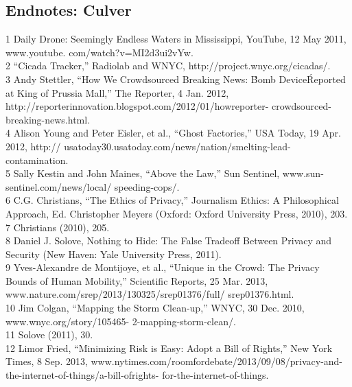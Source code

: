 \begin{itemize}
\begin{itemized}
\begin{itemize}
\section{Endnotes: Culver}
1 Daily Drone: Seemingly Endless Waters in Mississippi, YouTube, 12 May 2011, www.youtube.
com/watch?v=MI2d3ui2vYw.\\
2 ``Cicada Tracker,'' Radiolab and WNYC, http://project.wnyc.org/cicadas/.\\
3 Andy Stettler, ``How We Crowdsourced Breaking News: \'Bomb Device\' Reported at King of
Prussia Mall,'' The Reporter, 4 Jan. 2012, http://reporterinnovation.blogspot.com/2012/01/howreporter-
crowdsourced-breaking-news.html.\\
4 Alison Young and Peter Eisler, et al., ``Ghost Factories,'' USA Today, 19 Apr. 2012, http://
usatoday30.usatoday.com/news/nation/smelting-lead-contamination.\\
5 Sally Kestin and John Maines, ``Above the Law,'' Sun Sentinel, www.sun-sentinel.com/news/local/
speeding-cops/.\\
6 C.G. Christians, ``The Ethics of Privacy,'' Journalism Ethics: A Philosophical Approach, Ed.
Christopher Meyers (Oxford: Oxford University Press, 2010), 203.\\
7 Christians (2010), 205.\\
8 Daniel J. Solove, Nothing to Hide: The False Tradeoff Between Privacy and Security (New Haven:
Yale University Press, 2011).\\
9 Yves-Alexandre de Montijoye, et al., ``Unique in the Crowd: The Privacy Bounds of Human
Mobility,'' Scientific Reports, 25 Mar. 2013, www.nature.com/srep/2013/130325/srep01376/full/
srep01376.html.\\
10 Jim Colgan, ``Mapping the Storm Clean-up,'' WNYC, 30 Dec. 2010, www.wnyc.org/story/105465-
2-mapping-storm-clean/.\\
11 Solove (2011), 30.\\
12 Limor Fried, ``Minimizing Risk is Easy: Adopt a Bill of Rights,'' New York Times, 8 Sep. 2013,
www.nytimes.com/roomfordebate/2013/09/08/privacy-and-the-internet-of-things/a-bill-ofrights-
for-the-internet-of-things.\\



\end{itemize}
\end{itemized}
\end{itemize}
